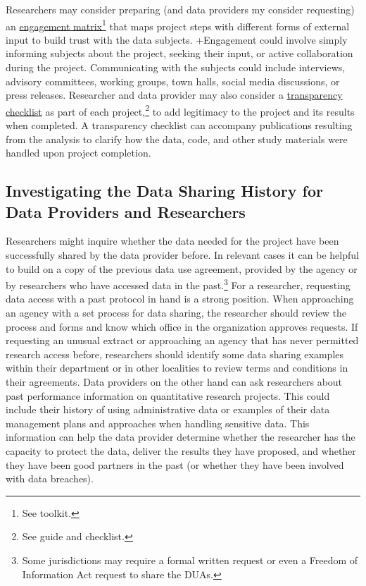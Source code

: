 \documentclass[
]{book}
\begin{document}
\begin{bbox}

Researchers may consider preparing (and data providers my consider requesting) an \href{\%5Bhttps://fpf.org/wp-content/uploads/2018/09/FPF-AISP_Nothing-to-Hide.pdf\%5D\%7B.ul\%7D}{engagement matrix}\footnote{See \citet{futureofprivacyforum2018} toolkit.} that maps project steps with different forms of external input to build trust with the data subjects. +Engagement\textbar{} could involve simply informing subjects about the project, seeking their input, or active collaboration during the project. Communicating with the subjects could include interviews, advisory committees, working groups, town halls, social media discussions, or press releases. Researcher and data provider may also consider a \href{http://www.stat.columbia.edu/~gelman/research/published/checklist.pdf}{transparency checklist} as part of each project,\footnote{See \citet{aczel2020} guide and checklist.} to add legitimacy to the project and its results when completed. A transparency checklist can accompany publications resulting from the analysis to clarify how the data, code, and other study materials were handled upon project completion.

\end{bbox}

\hypertarget{investigating-the-data-sharing-history-for-data-providers-and-researchers}{%
\subsection{Investigating the Data Sharing History for Data Providers and Researchers}\label{investigating-the-data-sharing-history-for-data-providers-and-researchers}}

Researchers might inquire whether the data needed for the project have been successfully shared by the data provider before. In relevant cases it can be helpful to build on a copy of the previous data use agreement, provided by the agency or by researchers who have accessed data in the past.\footnote{Some jurisdictions may require a formal written request or even a Freedom of Information Act request to share the DUAs.} For a researcher, requesting data access with a past protocol in hand is a strong position. When approaching an agency with a set process for data sharing, the researcher should review the process and forms and know which office in the organization approves requests. If requesting an unusual extract or approaching an agency that has never permitted research access before, researchers should identify some data sharing examples within their department or in other localities to review terms and conditions in their agreements. Data providers on the other hand can ask researchers about past performance information on quantitative research projects. This could include their history of using administrative data or examples of their data management plans and approaches when handling sensitive data. This information can help the data provider determine whether the researcher has the capacity to protect the data, deliver the results they have proposed, and whether they have been good partners in the past (or whether they have been involved with data breaches).
\end{document}

